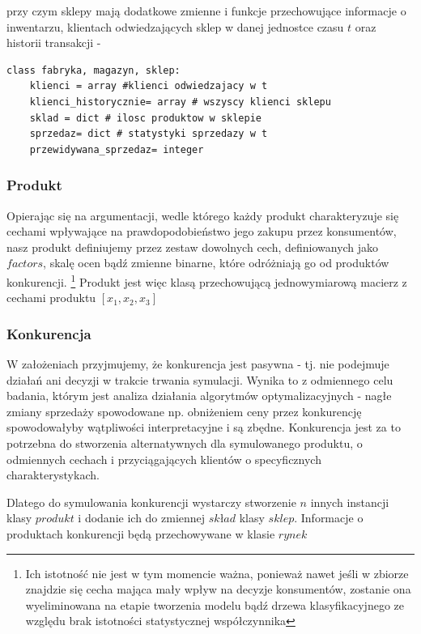 \documentclass{article}
\begin{document}
przy czym sklepy mają dodatkowe zmienne i funkcje przechowujące informacje o inwentarzu, klientach odwiedzających sklep w danej jednostce czasu $t$ oraz historii transakcji - 

\begin{lstlisting}[frame=single]  
class fabryka, magazyn, sklep:   
	klienci = array #klienci odwiedzajacy w t
	klienci_historycznie= array # wszyscy klienci sklepu
	sklad = dict # ilosc produktow w sklepie
	sprzedaz= dict # statystyki sprzedazy w t
	przewidywana_sprzedaz= integer 
\end{lstlisting}


\subsubsection{Produkt}

Opierając się na argumentacji, wedle którego każdy produkt charakteryzuje się cechami wpływające na prawdopodobieństwo jego zakupu przez konsumentów, nasz produkt definiujemy przez zestaw dowolnych cech, definiowanych jako $factors$, skalę ocen bądź zmienne binarne, które odróżniają go od produktów konkurencji. \footnote{Ich istotność nie jest w tym momencie ważna, ponieważ nawet jeśli w zbiorze znajdzie się cecha mająca mały wpływ na decyzje konsumentów, zostanie ona wyeliminowana na etapie tworzenia modelu bądź drzewa klasyfikacyjnego ze względu brak istotności statystycznej współczynnika} Produkt jest więc klasą przechowującą jednowymiarową macierz z cechami produktu $[x_1,x_2,x_3]$

\subsubsection{Konkurencja}
 
W założeniach przyjmujemy, że konkurencja jest pasywna - tj. nie podejmuje działań ani decyzji w trakcie trwania symulacji. Wynika to z odmiennego celu badania, którym jest analiza działania algorytmów optymalizacyjnych - nagłe zmiany sprzedaży spowodowane np. obniżeniem ceny przez konkurencję spowodowałyby wątpliwości interpretacyjne i są zbędne. Konkurencja jest za to potrzebna do stworzenia alternatywnych dla symulowanego produktu, o odmiennych cechach i przyciągających klientów o specyficznych charakterystykach. 

Dlatego do symulowania konkurencji wystarczy stworzenie $n$ innych instancji klasy $produkt$ i dodanie ich do zmiennej $skład$ klasy $sklep$. Informacje o produktach konkurencji będą przechowywane w klasie $rynek$
\end{document}
